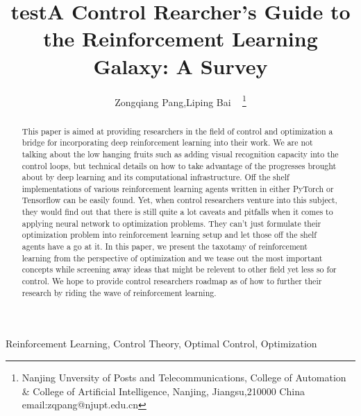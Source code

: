 \documentclass[journal]{IEEEtran}
\begin{document}
    \title{test}
\title{A Control Rearcher's Guide to the Reinforcement Learning Galaxy: A Survey}
\author{ Zongqiang Pang,Liping Bai ~ \thanks{Nanjing Unversity of Posts and Telecommunications, College of Automation \& College of Artificial Intelligence, Nanjing, Jiangsu,210000 China email:zqpang@njupt.edu.cn}}
\maketitle
\begin{abstract}
This paper is aimed at providing researchers in the field of control and optimization a bridge for incorporating deep reinforcement learning into their work. We are not talking about the low hanging fruits such as adding visual recognition capacity into the control loops, but technical details on how to take advantage of the progresses brought about by deep learning and its computational infrastructure. Off the shelf implementations of various reinforcement learning agents written in either PyTorch or Tensorflow can be easily found. Yet, when control researchers venture into this subject, they would find out that there is still quite a lot caveats and pitfalls when it comes to applying neural network to optimization problems. They can't just formulate their optimization problem into reinforcement learning setup and let those off the shelf agents have a go at it. In this paper, we present the taxotamy of reinforcement learning from the perspective of optimization and we tease out the most important concepts while screening away ideas that might be relevent to other field yet less so for control. We hope to provide control researchers roadmap as of how to further their research by riding the wave of reinforcement learning.
\end{abstract}
\begin{IEEEkeywords}
Reinforcement Learning, Control Theory, Optimal Control, Optimization
\end{IEEEkeywords}
%
\IEEEpeerreviewmaketitle
\end{document}
